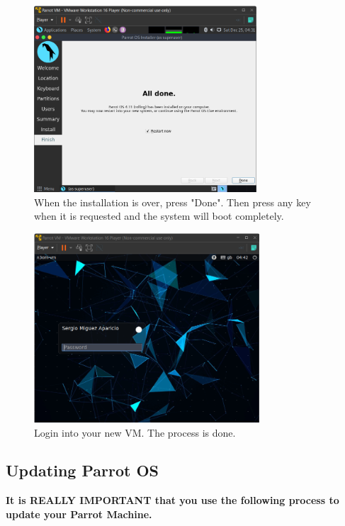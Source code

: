 \documentclass[a4paper]{article}
\begin{document}
    \begin{figure}[h!]
        \centering
        \includegraphics[width=0.74\textwidth]{Images/Install_OS/OS_10.png}
        \caption{When the installation is over, press "Done". Then press any key when it is requested and
        the system will boot completely.}
    \end{figure}

    \clearpage
    \begin{figure}[h]
        \centering
        \includegraphics[width=0.75\textwidth]{Images/Install_OS/OS_11.png}
        \caption{Login into your new VM. The process is done.}
    \end{figure}

    \clearpage
    \subsection{\textbf{Updating Parrot OS}}
    \begin{tcolorbox}[colback=red!25!white,colframe=red]
        \centering
        \textbf{It is REALLY IMPORTANT that you use the following process to update your Parrot Machine.}
    \end{tcolorbox}
\end{document}
